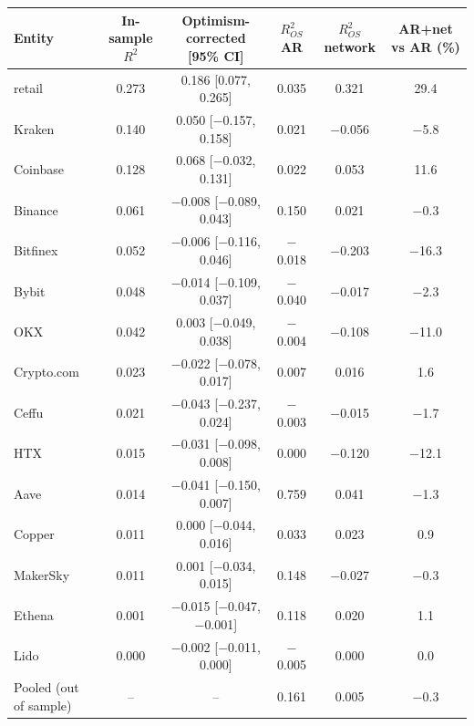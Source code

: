\documentclass[referee,pdflatex,sn-mathphys-ay]{sn-jnl}
\newcommand{\fitbox}{\ifdim\wd\tabbox>\linewidth\resizebox{\linewidth}{!}{\usebox{\tabbox}}\else\usebox{\tabbox}\fi}%
\theoremstyle{thmstyleone}%
\theoremstyle{thmstyletwo}%
\theoremstyle{thmstylethree}%
\begin{document}
\begin{lrbox}{\tabbox}\footnotesize\setlength{\tabcolsep}{3pt}%
\begin{tabular}{@{}lccccc@{}}
\toprule
\textbf{Entity} & \textbf{In-sample $R^2$} & \textbf{Optimism-corrected [95\% CI]} & \textbf{$R^2_{OS}$ AR} & \textbf{$R^2_{OS}$ network} & \textbf{AR+net vs AR (\%)}\\
\midrule
retail & 0.273 & 0.186 [0.077, 0.265] & 0.035 & 0.321 & 29.4 \\
Kraken & 0.140 & 0.050 [$-$0.157, 0.158] & 0.021 & $-$0.056 & $-$5.8 \\
Coinbase & 0.128 & 0.068 [$-$0.032, 0.131] & 0.022 & 0.053 & 11.6 \\
Binance & 0.061 & $-$0.008 [$-$0.089, 0.043] & 0.150 & 0.021 & $-$0.3 \\
Bitfinex & 0.052 & $-$0.006 [$-$0.116, 0.046] & $-$0.018 & $-$0.203 & $-$16.3 \\
Bybit & 0.048 & $-$0.014 [$-$0.109, 0.037] & $-$0.040 & $-$0.017 & $-$2.3 \\
OKX & 0.042 & 0.003 [$-$0.049, 0.038] & $-$0.004 & $-$0.108 & $-$11.0 \\
Crypto.com & 0.023 & $-$0.022 [$-$0.078, 0.017] & 0.007 & 0.016 & 1.6 \\
Ceffu & 0.021 & $-$0.043 [$-$0.237, 0.024] & $-$0.003 & $-$0.015 & $-$1.7 \\
HTX & 0.015 & $-$0.031 [$-$0.098, 0.008] & 0.000 & $-$0.120 & $-$12.1 \\
Aave & 0.014 & $-$0.041 [$-$0.150, 0.007] & 0.759 & 0.041 & $-$1.3 \\
Copper & 0.011 & 0.000 [$-$0.044, 0.016] & 0.033 & 0.023 & 0.9 \\
MakerSky & 0.011 & 0.001 [$-$0.034, 0.015] & 0.148 & $-$0.027 & $-$0.3 \\
Ethena & 0.001 & $-$0.015 [$-$0.047, $-$0.001] & 0.118 & 0.020 & 1.1 \\
Lido & 0.000 & $-$0.002 [$-$0.011, 0.000] & $-$0.005 & 0.000 & 0.0 \\
\midrule
Pooled (out of sample) & -- & -- & 0.161 & 0.005 & $-$0.3 \\
\bottomrule
\end{tabular}
\end{lrbox}
\begin{tableorg}[tbp]
\centering
\caption{Explained stress by entity, hourly October 2025. In-sample $R^2$ and its optimism-corrected value
with 95\% interval are from the bootstrap; out-of-sample $R^2_{OS}$ is from expanding-window one-step prediction.
Rows are sorted by in-sample $R^2$.}
\label{tab:explained}
\fitbox
\end{tableorg}
\end{document}
